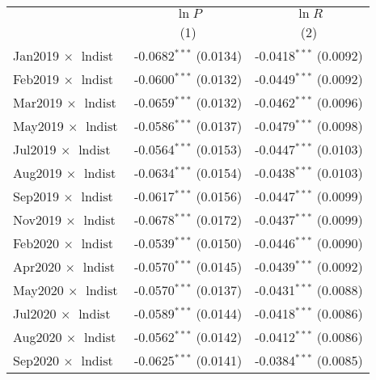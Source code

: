 
\begin{table}
   \centering
   \scriptsize
   \begin{threeparttable}[b]
      
      \bigskip
      \begin{tabular}{lcc}
         \toprule
                                               & $\ln P$                  & $\ln R$\\   
                                               & (1)                      & (2)\\  
         \midrule 
         Jan2019 $\times$ $\ln \text{dist}$    & -0.0682$^{***}$ (0.0134) & -0.0418$^{***}$ (0.0092)\\   
         Feb2019 $\times$ $\ln \text{dist}$    & -0.0600$^{***}$ (0.0132) & -0.0449$^{***}$ (0.0092)\\   
         Mar2019 $\times$ $\ln \text{dist}$    & -0.0659$^{***}$ (0.0132) & -0.0462$^{***}$ (0.0096)\\   
         May2019 $\times$ $\ln \text{dist}$    & -0.0586$^{***}$ (0.0137) & -0.0479$^{***}$ (0.0098)\\   
         Jul2019 $\times$ $\ln \text{dist}$    & -0.0564$^{***}$ (0.0153) & -0.0447$^{***}$ (0.0103)\\   
         Aug2019 $\times$ $\ln \text{dist}$    & -0.0634$^{***}$ (0.0154) & -0.0438$^{***}$ (0.0103)\\   
         Sep2019 $\times$ $\ln \text{dist}$    & -0.0617$^{***}$ (0.0156) & -0.0447$^{***}$ (0.0099)\\   
         Nov2019 $\times$ $\ln \text{dist}$    & -0.0678$^{***}$ (0.0172) & -0.0437$^{***}$ (0.0099)\\   
         Feb2020 $\times$ $\ln \text{dist}$    & -0.0539$^{***}$ (0.0150) & -0.0446$^{***}$ (0.0090)\\   
         Apr2020 $\times$ $\ln \text{dist}$    & -0.0570$^{***}$ (0.0145) & -0.0439$^{***}$ (0.0092)\\   
         May2020 $\times$ $\ln \text{dist}$    & -0.0570$^{***}$ (0.0137) & -0.0431$^{***}$ (0.0088)\\   
         Jul2020 $\times$ $\ln \text{dist}$    & -0.0589$^{***}$ (0.0144) & -0.0418$^{***}$ (0.0086)\\   
         Aug2020 $\times$ $\ln \text{dist}$    & -0.0562$^{***}$ (0.0142) & -0.0412$^{***}$ (0.0086)\\   
         Sep2020 $\times$ $\ln \text{dist}$    & -0.0625$^{***}$ (0.0141) & -0.0384$^{***}$ (0.0085)\\   

\end{tabular}
\end{threeparttable}
\end{table}
